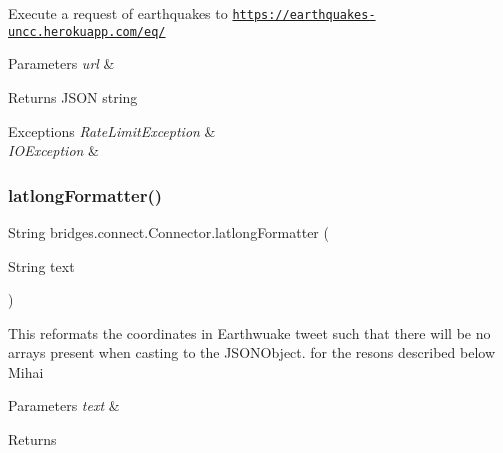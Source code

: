 Execute a request of earthquakes to \href{https://earthquakes-uncc.herokuapp.com/eq/}{\tt https\+://earthquakes-\/uncc.\+herokuapp.\+com/eq/} 
\begin{DoxyParams}{Parameters}
{\em url} & \\
\hline
\end{DoxyParams}
\begin{DoxyReturn}{Returns}
J\+S\+ON string 
\end{DoxyReturn}

\begin{DoxyExceptions}{Exceptions}
{\em Rate\+Limit\+Exception} & \\
\hline
{\em I\+O\+Exception} & \\
\hline
\end{DoxyExceptions}
\mbox{\label{classbridges_1_1connect_1_1_connector_a2318cd93d18ef58285598f6f9cdf727b}} 
\subsubsection{\texorpdfstring{latlong\+Formatter()}{latlongFormatter()}}
{\footnotesize\ttfamily String bridges.\+connect.\+Connector.\+latlong\+Formatter (\begin{DoxyParamCaption}\item[{String}]{text }\end{DoxyParamCaption})}

This reformats the coordinates in Earthwuake tweet such that there will be no arrays present when casting to the J\+S\+O\+N\+Object. for the resons described below Mihai 
\begin{DoxyParams}{Parameters}
{\em text} & \\
\hline
\end{DoxyParams}
\begin{DoxyReturn}{Returns}

\end{DoxyReturn}
\mbox{\label{classbridges_1_1connect_1_1_connector_a88e465aed707d59b96958dcc946ff6b4}} 
